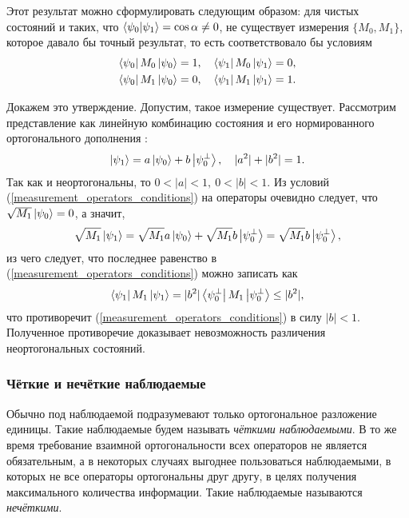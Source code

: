 Этот результат можно сформулировать следующим образом: для чистых состояний  и  таких, что
$\left\langle \psi_0|\psi_1\right\rangle = \cos \alpha \neq 0$, не существует измерения $\{M_0, M_1\}$, которое давало бы точный результат, то есть соответствовало бы условиям
\begin{eqnarray}\label{measurement_operators_conditions}
  \left\langle \psi_0 \right| M_0 \left| \psi_0 \right\rangle = 1,\quad \left\langle \psi_1 \right| M_0 \left| \psi_1 \right\rangle = 0, \nonumber\\
  \left\langle \psi_0 \right| M_1 \left| \psi_0 \right\rangle = 0,\quad \left\langle \psi_1 \right| M_1 \left| \psi_1 \right\rangle = 1.
\end{eqnarray}

Докажем это утверждение. Допустим, такое измерение существует. Рассмотрим представление  как линейную комбинацию состояния  и его нормированного ортогонального дополнения :
\begin{equation} \left| \psi_1 \right\rangle = a\left| \psi_0 \right\rangle + b\left| \psi_0^\bot \right\rangle,\quad |a^2| + |b^2| = 1. \end{equation}
Так как  и  неортогональны, то $0 < |a| < 1,\  0 < |b| < 1$.
Из условий (\ref{measurement_operators_conditions}) на операторы очевидно следует, что $\sqrt{M_1}\left| \psi_0 \right\rangle = 0$, а значит,
\begin{equation} \sqrt{M_1}\left| \psi_1 \right\rangle = \sqrt{M_1} a\left| \psi_0 \right\rangle + \sqrt{M_1} b\left| \psi_0^\bot \right\rangle = 
\sqrt{M_1} b\left| \psi_0^\bot \right\rangle, \end{equation}
из чего следует, что последнее равенство в (\ref{measurement_operators_conditions}) можно записать как
\begin{equation} \left\langle \psi_1 \right| M_1 \left| \psi_1 \right\rangle = |b^2| \left\langle \psi_0^\bot \right| M_1 \left| \psi_0^\bot \right\rangle \leq |b^2|, \end{equation}
что противоречит (\ref{measurement_operators_conditions}) в силу $|b| < 1$. Полученное противоречие доказывает невозможность различения неортогональных состояний.

\subsubsection{Чёткие и нечёткие наблюдаемые}
Обычно под наблюдаемой подразумевают только ортогональное разложение единицы. Такие наблюдаемые будем называть \textit{чёткими наблюдаемыми}\cite{holevo}. В то же время требование взаимной ортогональности всех операторов не является обязательным, а в некоторых случаях выгоднее пользоваться наблюдаемыми, в которых не все операторы ортогональны друг другу, в целях получения максимального количества информации. Такие наблюдаемые называются \textit{нечёткими}.

